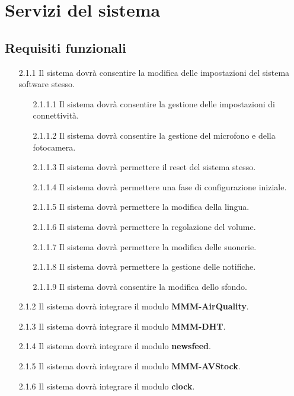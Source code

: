 \documentclass[a4paper,11pt]{article}       %
\begin{document}
\newpage

\section{Servizi del sistema}
    
    \subsection{Requisiti funzionali}
        \begin{itemize}
            \item[2.1.1] Il sistema dovrà consentire la modifica delle impostazioni del sistema software stesso.
                \begin{itemize}
                    \item[2.1.1.1] Il sistema dovrà consentire la gestione delle impostazioni di connettività.
                    \item[2.1.1.2] Il sistema dovrà consentire la gestione del microfono e della fotocamera.
                    \item[2.1.1.3] Il sistema dovrà permettere il reset del sistema stesso.
                    \item[2.1.1.4] Il sistema dovrà permettere una fase di configurazione iniziale.
                    \item[2.1.1.5] Il sistema dovrà permettere la modifica della lingua.
                    \item[2.1.1.6] Il sistema dovrà permettere la regolazione del volume.
                    \item[2.1.1.7] Il sistema dovrà permettere la modifica delle suonerie.
                    \item[2.1.1.8] Il sistema dovrà permettere la gestione delle notifiche.
                    \item[2.1.1.9] Il sistema dovrà consentire la modifica dello sfondo.
                \end{itemize}
            \item[2.1.2] Il sistema dovrà integrare il modulo \textbf{MMM-AirQuality}.
            \item[2.1.3] Il sistema dovrà integrare il modulo \textbf{MMM-DHT}.
            \item[2.1.4] Il sistema dovrà integrare il modulo \textbf{newsfeed}.
            \item[2.1.5] Il sistema dovrà integrare il modulo \textbf{MMM-AVStock}.
            \item[2.1.6] Il sistema dovrà integrare il modulo \textbf{clock}.

\end{itemize}
\end{document}
